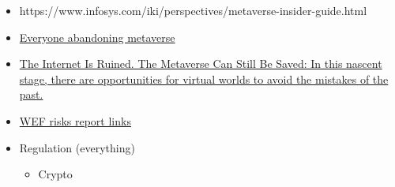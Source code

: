 \begin{itemize}
{  Crossing, in sp...}
\item
  https://www.infosys.com/iki/perspectives/metaverse-insider-guide.html
\item
  \href{https://www.reddit.com/r/CryptoCurrency/comments/128hqkw/meta_microsoft_and_disney_are_reversing_their/}{Everyone
  abandoning metaverse}
\item
  \href{https://www.wired.com/story/metaverse-ethics/}{The Internet Is
  Ruined. The Metaverse Can Still Be Saved: In this nascent stage, there
  are opportunities for virtual worlds to avoid the mistakes of the
  past.}
\item
  \href{https://sociable.co/government-and-policy/wef-global-risks-report-cyber-pandemic-erosion-trust-social-cohesion/}{WEF
  risks report links}
\item
  Regulation (everything)

  \begin{itemize}
   
  \item
    Crypto

    \begin{itemize}
     

\end{itemize}
\end{itemize}
\end{itemize}
